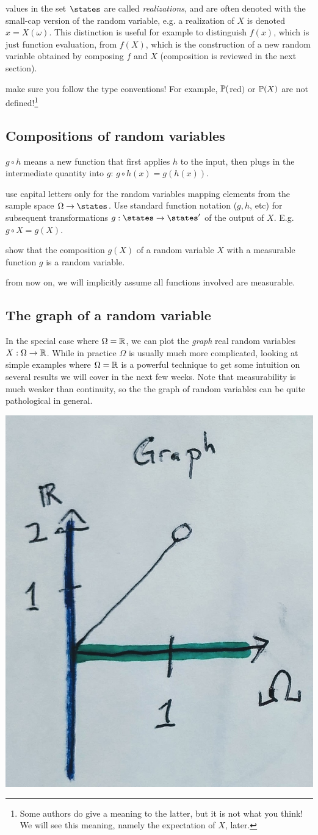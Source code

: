 \documentclass{article}
\begin{document}
 values in the set $\states$ are called \emph{realizations}, and are often denoted with the small-cap version of the random variable, e.g. a realization of $X$ is denoted $x = X(\omega)$. This distinction is useful for example to distinguish $f(x)$, which is just function evaluation, from $f(X)$, which is the construction of a new random variable obtained by composing $f$ and $X$ (composition is reviewed in the next section).

 make sure you follow the type conventions! For example, $\P($red$)$ or $\P(X)$ are not defined!\footnote{Some authors do give a meaning to the latter, but it is not what you think! We will see this meaning, namely the expectation of $X$, later.}


\subsection{Compositions of random variables}\label{sec:composition-of-rv}

 $g \circ h$ means a new function that first applies $h$ to the input, then plugs in the intermediate quantity into $g$: $g \circ h(x) = g(h(x))$. 

 use capital letters only for the random variables mapping elements from the sample space $\Omega \to \states$. Use standard function notation ($g, h$, etc) for subsequent transformations $g : \states \to \states'$  of the output of $X$. E.g. $g \circ X = g(X)$. 

 show that the composition $g(X)$ of a random variable $X$ with a measurable function $g$ is a random variable.

 from now on, we will implicitly assume all functions involved are measurable. 


\subsection{The graph of a random variable}

In the special case where $\Omega = \R$, we can plot the \emph{graph} real random variables $X : \Omega \to \R$. While in practice $\Omega$ is usually much more complicated, looking at simple examples where $\Omega = \R$ is a powerful technique to get some intuition on several results we will cover in the next few weeks. Note that measurability is much weaker than continuity, so the the graph of random variables can be quite pathological in general. 
\begin{center}
	\includegraphics[width=0.3\linewidth]{figures/graph}
\end{center}
\end{document}
